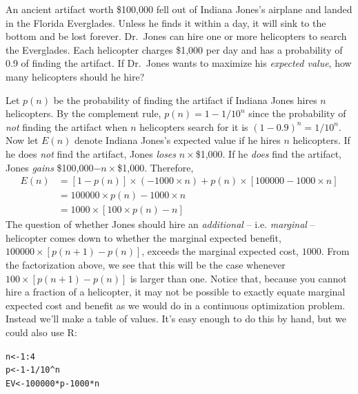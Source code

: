 \documentclass[addpoints,12pt]{exam}\usepackage[]{graphicx}\usepackage[]{xcolor}
\makeatletter
\newcommand{\hlnum}[1]{\textcolor[rgb]{0.686,0.059,0.569}{#1}}%
\newcommand{\hlopt}[1]{\textcolor[rgb]{0,0,0}{#1}}%
\newcommand{\hldef}[1]{\textcolor[rgb]{0.345,0.345,0.345}{#1}}%
\newcommand{\hlkwb}[1]{\textcolor[rgb]{0.69,0.353,0.396}{#1}}%
\newenvironment{kframe}{%
 \def\at@end@of@kframe{}%
 \ifinner\ifhmode%
  \def\at@end@of@kframe{\end{minipage}}%
  \begin{minipage}{\columnwidth}%
 \fi\fi%
 \def\FrameCommand##1{\hskip\@totalleftmargin \hskip-\fboxsep
 \colorbox{shadecolor}{##1}\hskip-\fboxsep
     \hskip-\linewidth \hskip-\@totalleftmargin \hskip\columnwidth}%
 \MakeFramed {\advance\hsize-\width
   \@totalleftmargin\z@ \linewidth\hsize
   \@setminipage}}%
 {\par\unskip\endMakeFramed%
 \at@end@of@kframe}
\newenvironment{knitrout}{}{} %
\makeatother
\begin{document}
\begin{questions}
  \question An ancient artifact worth \$100,000 fell out of Indiana Jones's airplane and landed in the Florida Everglades. Unless he finds it within a day, it will sink to the bottom and be lost forever. Dr.\ Jones can hire one or more helicopters to search the Everglades. Each helicopter charges \$1,000 per day and has a probability of 0.9 of finding the artifact. If Dr.\ Jones wants to maximize his \emph{expected value}, how many helicopters should he hire?
  \begin{solution}
    Let $p(n)$ be the probability of finding the artifact if Indiana Jones hires $n$ helicopters.
    By the complement rule, $p(n) = 1 - 1/10^n$ since the probability of \emph{not} finding the artifact when $n$ helicopters search for it is $(1 - 0.9)^n = 1/10^n$.
    Now let $E(n)$ denote Indiana Jones's expected value if he hires $n$ helicopters.
    If he does \emph{not} find the artifact, Jones \emph{loses} $n \times $\$1,000.
    If he \emph{does} find the artifact, Jones \emph{gains} \$100,000$- n\times $\$1,000.
    Therefore,
    \begin{align*}
      E(n) &= \left[ 1 - p(n) \right] \times \left( -1000 \times n \right) + p(n) \times \left[ 100000 - 1000 \times n \right]\\
      &= 100000 \times p(n) - 1000 \times n\\
      &= 1000 \times \left[ 100 \times p(n) - n \right]
    \end{align*}
    The question of whether Jones should hire an \emph{additional} -- i.e. \emph{marginal} -- helicopter comes down to whether the marginal expected benefit, $100000 \times \left[p(n+1) - p(n)\right]$, exceeds the marginal expected cost, $1000$.
    From the factorization above, we see that this will be the case whenever $100 \times \left[p(n+1) - p(n)\right]$ is larger than one.
    Notice that, because you cannot hire a fraction of a helicopter, it may not be possible to exactly equate marginal expected cost and benefit as we would do in a continuous optimization problem.
    Instead we'll make a table of values. 
    It's easy enough to do this by hand, but we could also use R:
\begin{knitrout}
\color{fgcolor}\begin{kframe}
\begin{alltt}
\hldef{n} \hlkwb{<-} \hlnum{1}\hlopt{:}\hlnum{4}
\hldef{p} \hlkwb{<-} \hlnum{1} \hlopt{-} \hlnum{1}\hlopt{/}\hlnum{10}\hlopt{^}\hldef{n}
\hldef{EV} \hlkwb{<-} \hlnum{100000} \hlopt{*} \hldef{p} \hlopt{-} \hlnum{1000} \hlopt{*} \hldef{n}

\end{alltt}
\end{kframe}
\end{knitrout}
\end{solution}
\end{questions}
\end{document}
